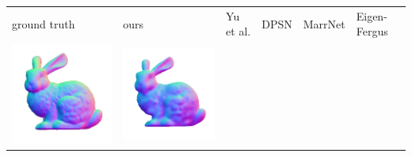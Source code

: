 \begin{center}
\begin{tabularx}{\linewidth}{@{}Y@{}Y@{}Y@{}Y@{}Y@{}Y@{}}
ground truth & ours & Yu et al. & DPSN & MarrNet & Eigen-Fergus \\
\includegraphics[width=\linewidth]{semisynthetic/20160617_14_gt.png} &
\includegraphics[width=\linewidth]{semisynthetic/20160617_14_ours_out.png} &

\end{tabularx}
\end{center}
